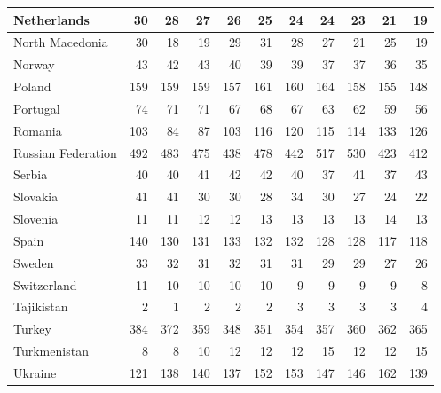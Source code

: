 \begin{table}
\begin{tabular}{|l|r|r|r|r|r|r|r|r|r|r|}
                   Netherlands&     30&     28&     27&     26&     25&     24&     24&     23&     21&     19\\\hline
               North Macedonia&     30&     18&     19&     29&     31&     28&     27&     21&     25&     19\\\hline
                        Norway&     43&     42&     43&     40&     39&     39&     37&     37&     36&     35\\\hline
                        Poland&    159&    159&    159&    157&    161&    160&    164&    158&    155&    148\\\hline
                      Portugal&     74&     71&     71&     67&     68&     67&     63&     62&     59&     56\\\hline
                       Romania&    103&     84&     87&    103&    116&    120&    115&    114&    133&    126\\\hline
            Russian Federation&    492&    483&    475&    438&    478&    442&    517&    530&    423&    412\\\hline
                        Serbia&     40&     40&     41&     42&     42&     40&     37&     41&     37&     43\\\hline
                      Slovakia&     41&     41&     30&     30&     28&     34&     30&     27&     24&     22\\\hline
                      Slovenia&     11&     11&     12&     12&     13&     13&     13&     13&     14&     13\\\hline
                         Spain&    140&    130&    131&    133&    132&    132&    128&    128&    117&    118\\\hline
                        Sweden&     33&     32&     31&     32&     31&     31&     29&     29&     27&     26\\\hline
                   Switzerland&     11&     10&     10&     10&     10&      9&      9&      9&      9&      8\\\hline
                    Tajikistan&      2&      1&      2&      2&      2&      3&      3&      3&      3&      4\\\hline
                        Turkey&    384&    372&    359&    348&    351&    354&    357&    360&    362&    365\\\hline
                  Turkmenistan&      8&      8&     10&     12&     12&     12&     15&     12&     12&     15\\\hline
                       Ukraine&    121&    138&    140&    137&    152&    153&    147&    146&    162&    139\\\hline

\end{tabular}
\end{table}
